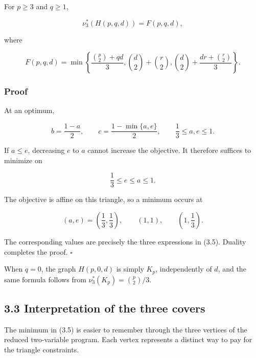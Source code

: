 \documentclass[english,11pt,a4paper]{article}
\begin{document}
For \(p\ge3\) and \(q\ge1\),

\[
\boxed{
\nu_3^*(H(p,q,d))
=
F(p,q,d)
},
\tag{3.4}
\]

where

\[
\boxed{
F(p,q,d)
=
\min\left\{
\frac{\binom p2+qd}{3},
\binom d2+\binom r2,
\binom d2+\frac{dr+\binom r2}{3}
\right\}
}.
\tag{3.5}
\]

\subsubsection{Proof}\label{proof}

At an optimum,

\[
b=\frac{1-a}{2},
\qquad
c=\frac{1-\min\{a,e\}}2,
\qquad
\frac13\le a,e\le1.
\]

If \(a\le e\), decreasing \(e\) to \(a\) cannot increase the objective.
It therefore suffices to minimize on

\[
\frac13\le e\le a\le1.
\]

The objective is affine on this triangle, so a minimum occurs at

\[
(a,e)=\left(\frac13,\frac13\right),
\qquad
(1,1),
\qquad
\left(1,\frac13\right).
\]

The corresponding values are precisely the three expressions in (3.5).
Duality completes the proof. \(\square\)

When \(q=0\), the graph \(H(p,0,d)\) is simply \(K_p\), independently of
\(d\), and the same formula follows from \(\nu_3^*(K_p)=\binom p2/3\).

\subsection{3.3 Interpretation of the three
covers}\label{interpretation-of-the-three-covers}

The minimum in (3.5) is easier to remember through the three vertices of
the reduced two-variable program. Each vertex represents a distinct way
to pay for the triangle constraints.
\end{document}
